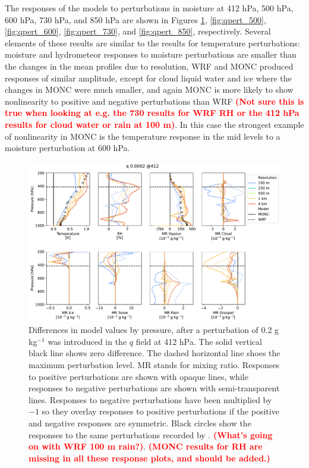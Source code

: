 \documentclass[draft]{agujournal2019}
\newcommand{\todo}[1]{\textcolor{red}{\textbf{(#1)}}}
\begin{document}
The responses of the models to perturbations in moisture at 412 hPa, 500 hPa,
600 hPa, 730 hPa, and 850 hPa are shown in Figures \ref{fig:qpert_412},
\ref{fig:qpert_500}, \ref{fig:qpert_600}, \ref{fig:qpert_730}, and
\ref{fig:qpert_850}, respectively. Several elements of these results are similar
to the results for temperature perturbations: moisture and hydrometeor responses
to moisture perturbations are smaller than the changes in the mean profiles due
to resolution, WRF and MONC produced responses of similar amplitude, except for
cloud liquid water and ice where the changes in MONC were much smaller, and
again MONC is more likely to show nonlinearity to positive and negative
perturbations than WRF \todo{Not sure this is true when looking at e.g. the 730
results for WRF RH or the 412 hPa results for cloud water or rain at 100 m}. In
this case the strongest example of nonlinearity in MONC is the temperature
response in the mid levels to a moisture perturbation at 600 hPa.

\begin{figure}[pth]
    \noindent\includegraphics[width=\textwidth]{figures/pert_diffs_q_0.0002_@412}
    \caption{Differences in model values by pressure, after a perturbation of
    0.2 g kg$^{-1}$ was introduced in the $q$ field at 412 hPa. The solid
    vertical black line shows zero difference. The dashed horizontal line shoes
    the maximum perturbation level. MR stands for mixing ratio. Responses to
    positive perturbations are shown with opaque lines, while responses to
    negative perturbations are shown with semi-transparent lines. Responses to
    negative perturbations have been multiplied by $-1$ so they overlay
    responses to positive perturbations if the positive and negative responses
    are symmetric. Black circles show the responses to the same perturbations
    recorded by . \todo{What's going on with WRF 100 m
    rain?}. \todo{MONC results for RH are missing in all these response plots,
    and should be added.}}
    \label{fig:qpert_412}
\end{figure}
\end{document}
